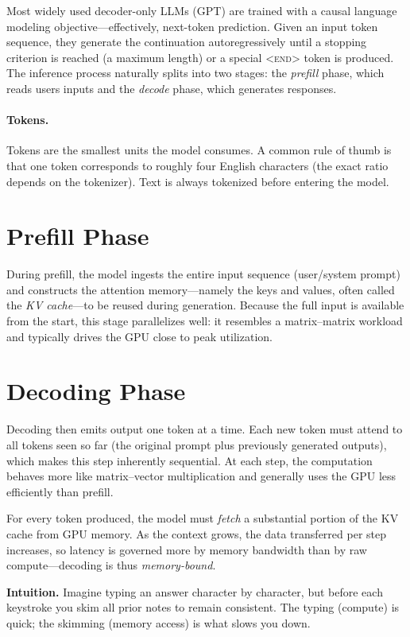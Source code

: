 Most widely used decoder-only LLMs (\eg GPT) are trained with a causal language modeling objective—effectively, next-token prediction. Given an input token sequence, they generate the continuation autoregressively until a stopping criterion is reached (\eg a maximum length) or a special \textsc{<end>} token is produced. The inference process naturally splits into two stages: \Ni the \textit{prefill} phase, which reads users inputs and \Nii the \textit{decode} phase, which generates responses.

\paragraph{Tokens.}
Tokens are the smallest units the model consumes. A common rule of thumb is that one token corresponds to roughly four English characters (the exact ratio depends on the tokenizer). Text is always tokenized before entering the model.

\section{Prefill Phase}

During prefill, the model ingests the entire input sequence (\eg user/system prompt) and constructs the attention memory—namely the keys and values, often called the \emph{KV cache}—to be reused during generation. Because the full input is available from the start, this stage parallelizes well: it resembles a matrix–matrix workload and typically drives the GPU close to peak utilization.

\section{Decoding Phase}

Decoding then emits output one token at a time. Each new token must attend to all tokens seen so far (the original prompt plus previously generated outputs), which makes this step inherently sequential. At each step, the computation behaves more like matrix–vector multiplication and generally uses the GPU less efficiently than prefill.

For every token produced, the model must \emph{fetch} a substantial portion of the KV cache from GPU memory. As the context grows, the data transferred per step increases, so latency is governed more by memory bandwidth than by raw compute—decoding is thus \emph{memory-bound}.

\textbf{Intuition.} Imagine typing an answer character by character, but before each keystroke you skim all prior notes to remain consistent. The typing (compute) is quick; the skimming (memory access) is what slows you down.

